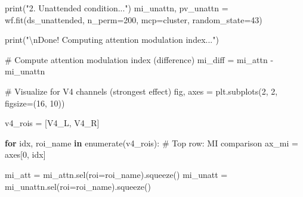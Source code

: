 \documentclass[
  11pt,
  letterpaper,
  oneside,
  openany]{book}
\newenvironment{Shaded}{\begin{snugshade}}{\end{snugshade}}
\newcommand{\BuiltInTok}[1]{\textcolor[rgb]{0.00,0.23,0.31}{#1}}
\newcommand{\CharTok}[1]{\textcolor[rgb]{0.13,0.47,0.30}{#1}}
\newcommand{\CommentTok}[1]{\textcolor[rgb]{0.37,0.37,0.37}{#1}}
\newcommand{\ControlFlowTok}[1]{\textcolor[rgb]{0.00,0.23,0.31}{\textbf{#1}}}
\newcommand{\DecValTok}[1]{\textcolor[rgb]{0.68,0.00,0.00}{#1}}
\newcommand{\KeywordTok}[1]{\textcolor[rgb]{0.00,0.23,0.31}{\textbf{#1}}}
\newcommand{\NormalTok}[1]{\textcolor[rgb]{0.00,0.23,0.31}{#1}}
\newcommand{\OperatorTok}[1]{\textcolor[rgb]{0.37,0.37,0.37}{#1}}
\newcommand{\StringTok}[1]{\textcolor[rgb]{0.13,0.47,0.30}{#1}}
\begin{document}
\begin{Shaded}
\begin{Highlighting}[]
\BuiltInTok{print}\NormalTok{(}\StringTok{"2. Unattended condition..."}\NormalTok{)}
\NormalTok{mi\_unattn, pv\_unattn }\OperatorTok{=}\NormalTok{ wf.fit(ds\_unattended, n\_perm}\OperatorTok{=}\DecValTok{200}\NormalTok{, mcp}\OperatorTok{=}\StringTok{\textquotesingle{}cluster\textquotesingle{}}\NormalTok{, random\_state}\OperatorTok{=}\DecValTok{43}\NormalTok{)}

\BuiltInTok{print}\NormalTok{(}\StringTok{"}\CharTok{\textbackslash{}n}\StringTok{Done! Computing attention modulation index..."}\NormalTok{)}

\CommentTok{\# Compute attention modulation index (difference)}
\NormalTok{mi\_diff }\OperatorTok{=}\NormalTok{ mi\_attn }\OperatorTok{{-}}\NormalTok{ mi\_unattn}

\CommentTok{\# Visualize for V4 channels (strongest effect)}
\NormalTok{fig, axes }\OperatorTok{=}\NormalTok{ plt.subplots(}\DecValTok{2}\NormalTok{, }\DecValTok{2}\NormalTok{, figsize}\OperatorTok{=}\NormalTok{(}\DecValTok{16}\NormalTok{, }\DecValTok{10}\NormalTok{))}

\NormalTok{v4\_rois }\OperatorTok{=}\NormalTok{ [}\StringTok{\textquotesingle{}V4\_L\textquotesingle{}}\NormalTok{, }\StringTok{\textquotesingle{}V4\_R\textquotesingle{}}\NormalTok{]}

\ControlFlowTok{for}\NormalTok{ idx, roi\_name }\KeywordTok{in} \BuiltInTok{enumerate}\NormalTok{(v4\_rois):}
    \CommentTok{\# Top row: MI comparison}
\NormalTok{    ax\_mi }\OperatorTok{=}\NormalTok{ axes[}\DecValTok{0}\NormalTok{, idx]}
    
\NormalTok{    mi\_att }\OperatorTok{=}\NormalTok{ mi\_attn.sel(roi}\OperatorTok{=}\NormalTok{roi\_name).squeeze()}
\NormalTok{    mi\_unatt }\OperatorTok{=}\NormalTok{ mi\_unattn.sel(roi}\OperatorTok{=}\NormalTok{roi\_name).squeeze()}
    

\end{Highlighting}
\end{Shaded}
\end{document}
